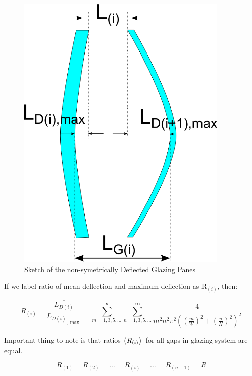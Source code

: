 \begin{figure}[hbtp] %
\centering
\includegraphics[width=0.9\textwidth, height=0.9\textheight, keepaspectratio=true]{media/image1798.png}
\caption{Sketch of the non-symetrically Deflected Glazing Panes \protect \label{fig:sketch-of-the-non-symetrically-deflected}}
\end{figure}

If we label ratio of mean deflection and maximum deflection as R\(_{(i)}\), then:

\begin{equation}
{R_{(i)}} = \frac{{\overline {{L_{D(i)}}} }}{{{L_{D(i)}}_{,\max }}} = \sum\limits_{m = 1,3,5,...}^\infty  {\sum\limits_{n = 1,3,5,...}^\infty  {\frac{4}{{{m^2}{n^2}{\pi ^2}{{\left( {{{(\frac{m}{W})}^2} + {{(\frac{n}{H})}^2}} \right)}^2}}}} }
\end{equation}

Important thing to note is that ratios $\PB{R_{\PB{i}}}$\ for all gaps in glazing system are equal.

\begin{equation}
{R_{\left( 1 \right)}} = {R_{\left( 2 \right)}} =  \ldots  = {R_{\left( i \right)}} =  \ldots  = {R_{\left( {n - 1} \right)}} = R
\end{equation}

